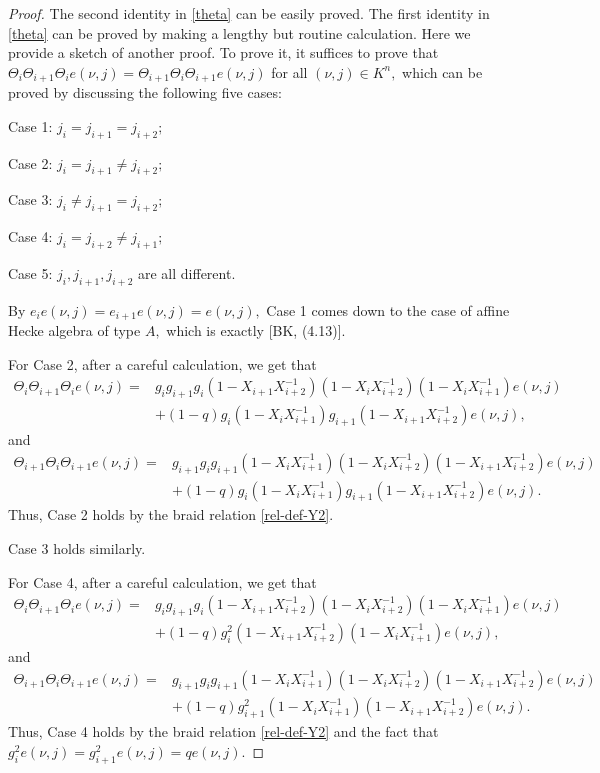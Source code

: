 \documentclass[11pt, reqno]{amsart} \textwidth=14.9cm \oddsidemargin=1cm \evensidemargin=1cm
\theoremstyle{definition}
\numberwithin{equation}{section}
\begin{document}
\begin{proof}
The second identity in \eqref{theta} can be easily proved. The first identity in \eqref{theta} can be proved by making a lengthy but routine calculation. Here we provide a sketch of another proof. To prove it, it suffices to prove that $\Theta_{i}\Theta_{i+1}\Theta_{i}e(\nu, j)=\Theta_{i+1}\Theta_{i}\Theta_{i+1}e(\nu, j)$ for all $(\nu, j)\in K^{n},$ which can be proved by discussing the following five cases:\vspace{0.2cm}

Case 1: $j_i=j_{i+1}=j_{i+2};$

Case 2: $j_i=j_{i+1}\neq j_{i+2};$

Case 3: $j_i\neq j_{i+1}=j_{i+2};$

Case 4: $j_i=j_{i+2}\neq j_{i+1};$

Case 5: $j_i, j_{i+1}, j_{i+2}$ are all different.\vspace{0.2cm}

By $e_{i}e(\nu, j)=e_{i+1}e(\nu, j)=e(\nu, j),$ Case 1 comes down to the case of affine Hecke algebra of type $A,$ which is exactly [BK, (4.13)].

For Case 2, after a careful calculation, we get that
\begin{align*}\Theta_{i}\Theta_{i+1}\Theta_{i}e(\nu, j)=&g_{i}g_{i+1}g_{i}(1-X_{i+1}X_{i+2}^{-1})(1-X_{i}X_{i+2}^{-1})(1-X_{i}X_{i+1}^{-1})e(\nu, j)\\&+(1-q)g_{i}(1-X_{i}X_{i+1}^{-1})g_{i+1}(1-X_{i+1}X_{i+2}^{-1})e(\nu, j),\end{align*}
and
\begin{align*}\Theta_{i+1}\Theta_{i}\Theta_{i+1}e(\nu, j)=&g_{i+1}g_{i}g_{i+1}(1-X_{i}X_{i+1}^{-1})(1-X_{i}X_{i+2}^{-1})(1-X_{i+1}X_{i+2}^{-1})e(\nu, j)\\&+(1-q)g_{i}(1-X_{i}X_{i+1}^{-1})g_{i+1}(1-X_{i+1}X_{i+2}^{-1})e(\nu, j).\end{align*}
Thus, Case 2 holds by the braid relation \eqref{rel-def-Y2}.

Case 3 holds similarly.

For Case 4, after a careful calculation, we get that
\begin{align*}\Theta_{i}\Theta_{i+1}\Theta_{i}e(\nu, j)=&g_{i}g_{i+1}g_{i}(1-X_{i+1}X_{i+2}^{-1})(1-X_{i}X_{i+2}^{-1})(1-X_{i}X_{i+1}^{-1})e(\nu, j)\\&+(1-q)g_{i}^{2}(1-X_{i+1}X_{i+2}^{-1})(1-X_{i}X_{i+1}^{-1})e(\nu, j),\end{align*}
and
\begin{align*}\Theta_{i+1}\Theta_{i}\Theta_{i+1}e(\nu, j)=&g_{i+1}g_{i}g_{i+1}(1-X_{i}X_{i+1}^{-1})(1-X_{i}X_{i+2}^{-1})(1-X_{i+1}X_{i+2}^{-1})e(\nu, j)\\&+(1-q)g_{i+1}^{2}(1-X_{i}X_{i+1}^{-1})(1-X_{i+1}X_{i+2}^{-1})e(\nu, j).\end{align*}
Thus, Case 4 holds by the braid relation \eqref{rel-def-Y2} and the fact that $g_{i}^{2}e(\nu, j)=g_{i+1}^{2}e(\nu, j)=qe(\nu, j)$.


\end{proof}
\end{document}
